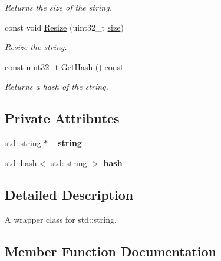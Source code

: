\begin{DoxyCompactItemize}
\begin{DoxyCompactList}\small\item\em Returns the size of the string. \end{DoxyCompactList}\item 
const void \hyperlink{class_ensum_1_1string_a2cb9f50ce1653a174433276cb1373fd6}{Resize} (uint32\+\_\+t \hyperlink{class_ensum_1_1string_ac3c5ca17258824b74dc8da3d5b7602cd}{size})\hypertarget{class_ensum_1_1string_a2cb9f50ce1653a174433276cb1373fd6}{}\label{class_ensum_1_1string_a2cb9f50ce1653a174433276cb1373fd6}

\begin{DoxyCompactList}\small\item\em Resize the string. \end{DoxyCompactList}\item 
const uint32\+\_\+t \hyperlink{class_ensum_1_1string_ac7c2bfe9a65ef8c2c850cdc80501ee34}{Get\+Hash} () const \hypertarget{class_ensum_1_1string_ac7c2bfe9a65ef8c2c850cdc80501ee34}{}\label{class_ensum_1_1string_ac7c2bfe9a65ef8c2c850cdc80501ee34}

\begin{DoxyCompactList}\small\item\em Returns a hash of the string. \end{DoxyCompactList}\end{DoxyCompactItemize}
\subsection*{Private Attributes}
\begin{DoxyCompactItemize}
\item 
std\+::string $\ast$ {\bfseries \+\_\+string}\hypertarget{class_ensum_1_1string_aab7e7b28d0303d683f579b84754e761f}{}\label{class_ensum_1_1string_aab7e7b28d0303d683f579b84754e761f}

\item 
std\+::hash$<$ std\+::string $>$ {\bfseries hash}\hypertarget{class_ensum_1_1string_ac09465ae80a330532deb00843bf74f37}{}\label{class_ensum_1_1string_ac09465ae80a330532deb00843bf74f37}

\end{DoxyCompactItemize}


\subsection{Detailed Description}
A wrapper class for std\+::string. 

\subsection{Member Function Documentation}
